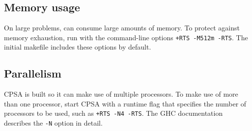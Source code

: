 \subsection{Memory usage}

On large problems, {\cpsa} can consume large amounts of memory.  To
protect against memory exhaustion, run {\cpsa} with the command-line
options \verb|+RTS -M512m -RTS|.  The initial makefile includes these
options by default.

\subsection{Parallelism}\label{sec:parallelism}

CPSA is built so it can make use of multiple processors.  To make use
of more than one processor, start CPSA with a runtime flag that
specifies the number of processors to be used, such as
\verb|+RTS -N4 -RTS|.  The GHC documentation describes the \texttt{-N}
option in detail.
